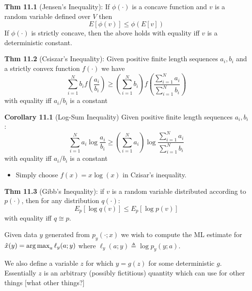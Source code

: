 \documentclass[12pt]{article} %
\begin{document}
\separate

\textbf{Thm 11.1} (Jensen's Inequality): If $\phi(\cdot)$ is a concave function and $v$ is a random variable defined over $V$ then
\begin{equation*}
    E[\phi(v)] \leq \phi(E[v])
\end{equation*}
If $\phi(\cdot)$ is strictly concave, then the above holds with equality iff $v$ is a deterministic constant.

\separate

\textbf{Thm 11.2} (Csiszar's Inequality): Given positive finite length sequences $a_i,b_i$ and a strictly convex function $f(\cdot)$ we have
\begin{equation*}
    \sum_{i=1}^N b_i f\left(\frac{a_i}{b_i}\right) \geq
    \left(
    \sum_{i=1}^N b_i
    \right)
    f \left(
    \frac{\sum_{i=1}^N a_i}{\sum_{i=1}^N b_i}
    \right)
\end{equation*}
with equality iff $a_i/b_i$ is a constant

\textbf{Corollary 11.1} (Log-Sum Inequality) Given positive finite length sequences $a_i,b_i$:
\begin{equation*}
    \sum_{i=1}^N a_i \log \frac{a_i}{b_i} \geq 
    \left(
    \sum_{i=1}^N a_i
    \right)
    \log
    \frac{
    \sum_{i=1}^N a_i
    }{
    \sum_{i=1}^N b_i
    }
\end{equation*}
with equality iff $a_i/b_i$ is a constant
\begin{itemize}[topsep=-1pt, itemsep=-1pt]
    \item Simply choose $f(x) = x \log(x)$ in Czisar's inequality.
\end{itemize}

\separate
\textbf{Thm 11.3} (Gibb's Inequality): if $v$ is a random variable distributed according to $p(\cdot)$, then for any distribution $q(\cdot)$:
\begin{equation*}
    E_p[\log q(v)] \leq E_p[\log p(v)]
\end{equation*}
with equality iff $q \cong p$.



\newpage
{}



Given data $y$ generated from $p_y(\cdot; x)$ we wish to compute the ML estimate for $\hat{x}(y) = \operatorname*{arg\,max}_{a} \ell_y(a;y)$ where $\ell_y(a;y) \triangleq \log p_y(y;a)$.

We also define a variable $z$ for which $y = g(z)$ for some deterministic $g$. Essentially $z$ is an arbitrary (possibly fictitious) quantity which can use for other things [what other things?]
\end{document}
